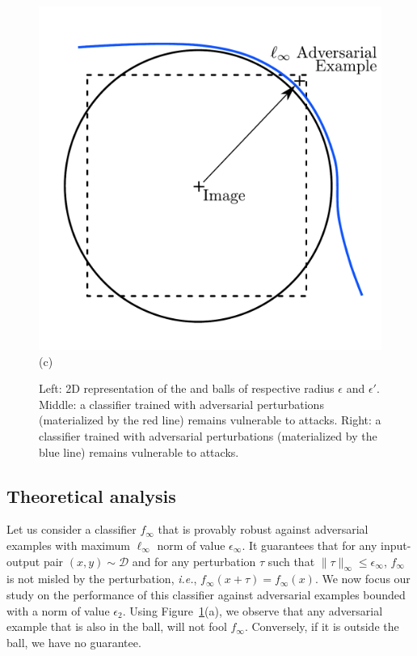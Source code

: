 \begin{figure}[ht]
\begin{minipage}{.32\linewidth}
  \end{minipage}
  \begin{minipage}{.32\linewidth}
      \centering
      \includegraphics[scale=0.15]{sections/appendix/ecml_rat/graphs/BallAdversarialLinfDecisionBoundary.pdf}\\(c)
  \end{minipage}
    \caption{ Left: 2D representation of the \linf and \ltwo balls of respective radius $\epsilon$ and $\epsilon'$. 
    Middle: a classifier trained with \linf adversarial perturbations  (materialized by the red line) remains vulnerable to \ltwo attacks. 
    Right: a classifier trained with \ltwo adversarial perturbations (materialized by the blue line) remains vulnerable to \linf attacks.}
  \label{figure:balls}
\end{figure}%

\subsection{Theoretical analysis}

Let us consider a classifier $f_{\infty}$ that is provably robust against adversarial examples with maximum $\ell_\infty$ norm of value $\epsilon_\infty$. It guarantees that for any input-output pair $(x,y) \sim \mathcal D$ and for any perturbation $\tau$ such that $\lVert\tau\rVert_\infty \leq \epsilon_\infty$, $f_{\infty}$ is not misled by the perturbation, \emph{i.e.}, $f_{\infty}(x + \tau) = f_{\infty}(x)$.
We now focus our study on the performance of this classifier against adversarial examples bounded with a \ltwo norm of value $\epsilon_2$. Using Figure~\ref{figure:balls}(a), we observe that any \ltwo adversarial example that is also in the \linf ball, will not fool $f_{\infty}$. Conversely, if it is outside the ball, we have no guarantee.

